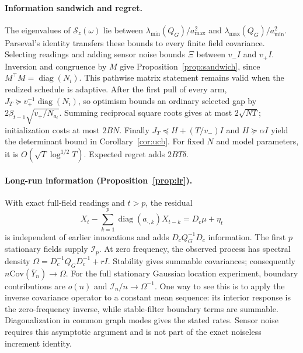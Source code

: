 \documentclass[sigconf,review,anonymous]{acmart}
\newcommand{\Cov}{\mathrm{Cov}}
\newcommand{\diag}{\operatorname{diag}}
\newcommand{\I}{\mathcal{I}}
\begin{document}
\paragraph{Information sandwich and regret.}
The eigenvalues of $\mathcal S_z(\omega)$ lie between $\lambda_{\min}(Q_G)/a_{\max}^2$ and $\lambda_{\max}(Q_G)/a_{\min}^2$. Parseval's identity transfers these bounds to every finite field covariance. Selecting readings and adding sensor noise bounds $\Xi$ between $v_-I$ and $v_+I$. Inversion and congruence by $M$ give Proposition~\ref{prop:sandwich}, since $M^\top M=\diag(N_i)$. This pathwise matrix statement remains valid when the realized schedule is adaptive. After the first pull of every arm, $J_T\succeq v_+^{-1}\diag(N_i)$, so optimism bounds an ordinary selected gap by $2\beta_{t-1}\sqrt{v_+/N_{a_t}}$. Summing reciprocal square roots gives at most $2\sqrt{NT}$; initialization costs at most $2BN$. Finally $J_T\preceq H+(T/v_-)I$ and $H\succeq\alpha I$ yield the determinant bound in Corollary~\ref{cor:ucb}. For fixed $N$ and model parameters, it is $O(\sqrt T\log^{1/2}T)$. Expected regret adds $2BT\delta$.

\paragraph{Long-run information (Proposition~\ref{prop:lr}).}
With exact full-field readings and $t>p$, the residual
\[
X_t-\sum_{k=1}^p\diag(a_{\cdot,k})X_{t-k}=D_c\mu+\eta_t
\]
is independent of earlier innovations and adds $D_cQ_G^{-1}D_c$ information. The first $p$ stationary fields supply $\I_p$. At zero frequency, the observed process has spectral density $\Omega=D_c^{-1}Q_GD_c^{-1}+rI$. Stability gives summable covariances; consequently $n\Cov(\bar Y_n)\to\Omega$. For the full stationary Gaussian location experiment, boundary contributions are $o(n)$ and $\I_n/n\to\Omega^{-1}$. One way to see this is to apply the inverse covariance operator to a constant mean sequence: its interior response is the zero-frequency inverse, while stable-filter boundary terms are summable. Diagonalization in common graph modes gives the stated rates. Sensor noise requires this asymptotic argument and is not part of the exact noiseless increment identity.
\end{document}

